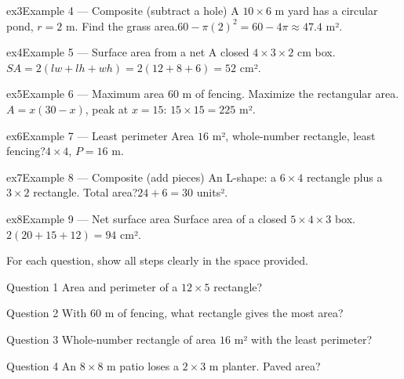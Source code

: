 \documentclass[11pt]{article}
\begin{document}
\begin{example}{ex3}{Example 4 --- Composite (subtract a hole)}
A $10\times6$ m yard has a circular pond, $r=2$ m. Find the grass area.\soln $60-\pi(2)^2=60-4\pi\approx47.4$ m².
\end{example}

\begin{example}{ex4}{Example 5 --- Surface area from a net}
A closed $4\times3\times2$ cm box.\soln $SA=2(lw+lh+wh)=2(12+8+6)=52$ cm².
\end{example}

\begin{example}{ex5}{Example 6 --- Maximum area}
$60$ m of fencing. Maximize the rectangular area.\soln $A=x(30-x)$, peak at $x=15$: $15\times15=225$ m².
\end{example}

\begin{example}{ex6}{Example 7 --- Least perimeter}
Area $16$ m², whole-number rectangle, least fencing?\soln $4\times4$, $P=16$ m.
\end{example}

\begin{example}{ex7}{Example 8 --- Composite (add pieces)}
An L-shape: a $6\times4$ rectangle plus a $3\times2$ rectangle. Total area?\soln $24+6=30$ units².
\end{example}

\begin{example}{ex8}{Example 9 --- Net surface area}
Surface area of a closed $5\times4\times3$ box.\soln $2(20+15+12)=94$ cm².
\end{example}

\clearpage
{}
For each question, show all steps clearly in the space provided.

\begin{qbox}{Question 1}
Area and perimeter of a $12\times5$ rectangle?\workspace{2.4cm}
\end{qbox}

\begin{qbox}{Question 2}
With $60$ m of fencing, what rectangle gives the most area?\workspace{2.4cm}
\end{qbox}

\begin{qbox}{Question 3}
Whole-number rectangle of area $16$ m² with the least perimeter?\workspace{2.4cm}
\end{qbox}

\begin{qbox}{Question 4}
An $8\times8$ m patio loses a $2\times3$ m planter. Paved area?\workspace{2.4cm}
\end{qbox}
\end{document}
